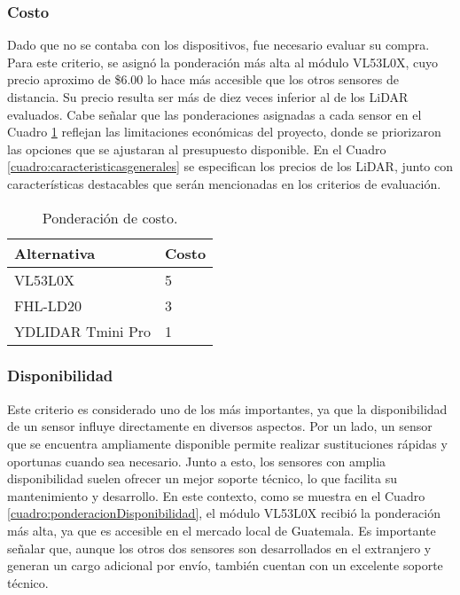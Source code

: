 \subsubsection{Costo}
Dado que no se contaba con los dispositivos, fue necesario evaluar su compra. Para este criterio, se asignó la ponderación más alta al módulo VL53L0X, cuyo precio aproximo de \$6.00 lo hace más accesible que los otros sensores de distancia. Su precio resulta ser más de diez veces inferior al de los LiDAR evaluados. Cabe señalar que las ponderaciones asignadas a cada sensor en el Cuadro \ref{cuadro:ponderacionCosto} reflejan las limitaciones económicas del proyecto, donde se priorizaron las opciones que se ajustaran al presupuesto disponible. En el Cuadro \ref{cuadro:caracteristicasgenerales} se especifican los precios de los LiDAR, junto con características destacables que serán mencionadas en los criterios de evaluación.

\begin{table}[H]
	\centering
	\begin{tabular}{|l|l|}
		\hline
		\textbf{Alternativa} & \textbf{Costo} \\ \hline
		VL53L0X & 5 \\ \hline
		FHL-LD20 & 3 \\ \hline
		YDLIDAR Tmini Pro & 1 \\ \hline
	\end{tabular}
	\caption{Ponderación de costo.} 
	\label{cuadro:ponderacionCosto}
\end{table}


\subsubsection{Disponibilidad}
Este criterio es considerado uno de los más importantes, ya que la disponibilidad de un sensor influye directamente en diversos aspectos. Por un lado, un sensor que se encuentra ampliamente disponible permite realizar sustituciones rápidas y oportunas cuando sea necesario. Junto a esto, los sensores con amplia disponibilidad suelen ofrecer un mejor soporte técnico, lo que facilita su mantenimiento y desarrollo. En este contexto, como se muestra en el Cuadro \ref{cuadro:ponderacionDisponibilidad}, el módulo VL53L0X recibió la ponderación más alta, ya que es accesible en el mercado local de Guatemala. Es importante señalar que, aunque los otros dos sensores son desarrollados en el extranjero y generan un cargo adicional por envío, también cuentan con un excelente soporte técnico. 

